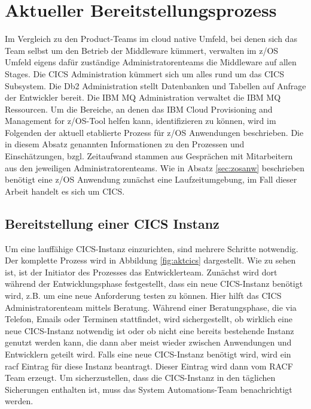 \section{Aktueller Bereitstellungsprozess}\label{sec:aktbereit}
Im Vergleich zu den Product-Teams im cloud native Umfeld, bei denen sich das Team selbst um den Betrieb der Middleware kümmert, verwalten im z/OS Umfeld eigens dafür zuständige Administratorenteams die Middleware auf allen Stages.
Die \glqq CICS Administration\grqq{} kümmert sich um alles rund um das CICS Subsystem.
Die \glqq Db2 Administration\grqq{} stellt Datenbanken und Tabellen auf Anfrage der Entwickler bereit.
Die \glqq IBM MQ Administration\grqq{} verwaltet die IBM MQ Ressourcen.
Um die Bereiche, an denen das \glqq IBM Cloud Provisioning and Management for z/OS\grqq-Tool helfen kann, identifizieren zu können, wird im Folgenden der aktuell etablierte Prozess für z/OS Anwendungen beschrieben.
Die in diesem Absatz genannten Informationen zu den Prozessen und Einschätzungen, bzgl. Zeitaufwand stammen aus Gesprächen mit Mitarbeitern aus den jeweiligen Administratorenteams.
Wie in Absatz \ref{sec:zosanw} beschrieben benötigt eine z/OS Anwendung zunächst eine Laufzeitumgebung, im Fall dieser Arbeit handelt es sich um CICS.

\subsection{Bereitstellung einer CICS Instanz}\label{ssec:aktcics}
Um eine lauffähige CICS-Instanz einzurichten, sind mehrere Schritte notwendig.
Der komplette Prozess wird in Abbildung \ref{fig:aktcics} dargestellt.
Wie zu sehen ist, ist der Initiator des Prozesses das Entwicklerteam.
Zunächst wird dort während der Entwicklungsphase festgestellt, dass ein neue CICS-Instanz benötigt wird, z.B. um eine neue Anforderung testen zu können. 
Hier hilft das CICS Administratorenteam mittels Beratung.
Während einer Beratungsphase, die via Telefon, Emails oder Terminen stattfindet, wird sichergestellt, ob wirklich eine neue CICS-Instanz notwendig ist oder ob nicht eine bereits bestehende Instanz genutzt werden kann, die dann aber meist wieder zwischen Anwendungen und Entwicklern geteilt wird.
Falls eine neue CICS-Instanz benötigt wird, wird ein \Gls{racf} Eintrag für diese Instanz beantragt.
Dieser Eintrag wird dann vom RACF Team erzeugt.
Um sicherzustellen, dass die CICS-Instanz in den täglichen Sicherungen enthalten ist, muss das System Automations-Team benachrichtigt werden.


